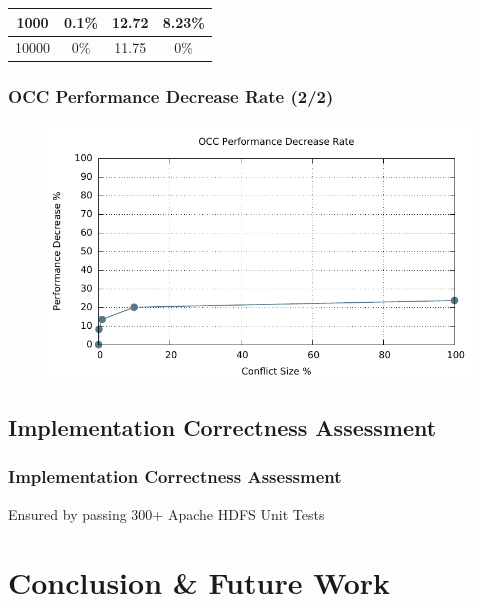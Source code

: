 \documentclass{beamer}
\begin{document}
\begin{frame}
\begin{table}[ht]
\begin{tabular}{|c|c|c|c|}
			1000                                                                                                           & 0.1\%                                                             & 12.72                                                                     & 8.23\%                                                                                            \\ \hline
			10000                                                                                                          & 0\%                                                               & 11.75                                                                     & 0\%                                                                                               \\ \hline
		\end{tabular}
	\end{table}
\end{frame}
\begin{frame}
	\frametitle{OCC Performance Decrease Rate (2/2)}
	\begin{figure}[ht]
		\centering
		\includegraphics[width=\linewidth]{figs/conRate.pdf}
	\end{figure}
\end{frame}

\subsection{Implementation Correctness Assessment}
\begin{frame}
	\frametitle{Implementation Correctness Assessment}
	Ensured by passing 300+ Apache HDFS Unit Tests
\end{frame}

\section{Conclusion \& Future Work}
\end{document}
